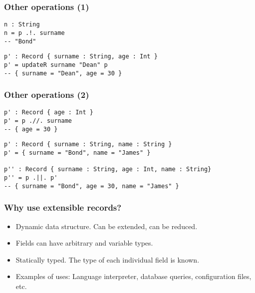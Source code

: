 \documentclass{beamer}
\begin{document}
\begin{frame}[fragile]
\frametitle{Other operations (1)}

\begin{example}[Lookup]
\begin{verbatim}
n : String
n = p .!. surname
-- "Bond"
\end{verbatim}
\end{example}

\pause

\vspace{12pt}

\begin{example}[Update]
\begin{verbatim}
p' : Record { surname : String, age : Int }
p' = updateR surname "Dean" p
-- { surname = "Dean", age = 30 }
\end{verbatim}
\end{example}

\end{frame}

\begin{frame}[fragile]
\frametitle{Other operations (2)}

\begin{example}[Delete]
\begin{verbatim}
p' : Record { age : Int }
p' = p .//. surname
-- { age = 30 }
\end{verbatim}
\end{example}

\pause

\begin{example}[Union]
\begin{verbatim}
p' : Record { surname : String, name : String }
p' = { surname = "Bond", name = "James" }

p'' : Record { surname : String, age : Int, name : String}
p'' = p .||. p'
-- { surname = "Bond", age = 30, name = "James" }
\end{verbatim}
\end{example}

\end{frame}

\begin{frame}
\frametitle{Why use extensible records?}

\begin{itemize}
\item Dynamic data structure. Can be extended, can be reduced.
\item Fields can have arbitrary and variable types.
\item Statically typed. The type of each individual field is known.
\item Examples of uses: Language interpreter, database queries, configuration files, etc.
\end{itemize}

\end{frame}
\end{document}

